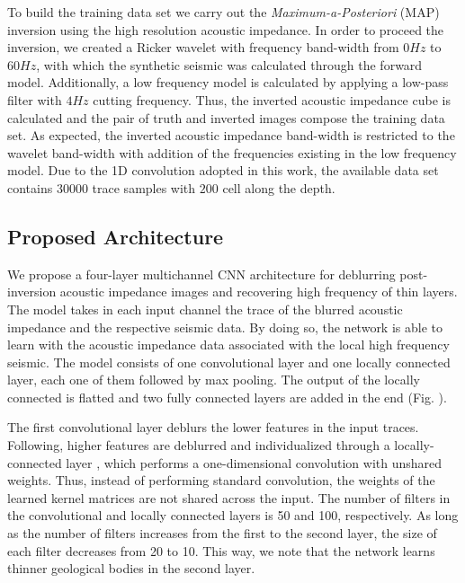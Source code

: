 \documentclass[journal]{IEEEtran}
\begin{document}
To build the training data set we carry out the \textit{Maximum-a-Posteriori} (MAP) \cite{Buland2003,Figueiredo2012} inversion using the high resolution acoustic
impedance. In order to proceed the inversion, we created a Ricker wavelet with
frequency band-width from $0Hz$ to $60Hz$, with which the synthetic seismic was
calculated through the forward model. Additionally, a low frequency
model is calculated by applying a low-pass filter with $4Hz$ cutting frequency.
Thus, the inverted acoustic impedance cube is calculated and the pair of truth
and inverted images compose the training data set. As expected, the inverted
acoustic impedance band-width is restricted to the wavelet band-width with
addition of the frequencies existing in the low frequency model. Due to the 1D
convolution adopted in this work, the available data set contains $30000$ trace
samples with $200$ cell along the depth.

\subsection{Proposed Architecture}

We propose a four-layer multichannel CNN architecture for deblurring
post-inversion acoustic impedance images and recovering high
frequency of thin layers. The model takes in each input channel the
trace of the blurred acoustic impedance and the respective seismic
data. By doing so, the network is able to learn with the acoustic
impedance data associated with the local high frequency seismic.
The model consists of one convolutional layer and one locally connected
layer, each one of them followed by max pooling. The output of the
locally connected is flatted and two fully connected layers are
added in the end (Fig. ).

The first convolutional layer deblurs the lower features in
the input traces. Following, higher features are deblurred
and individualized through a locally-connected layer \cite{},
which performs a one-dimensional convolution
with unshared weights. Thus, instead of performing standard
convolution, the weights of the learned kernel matrices are not
shared across the input. %
The number of filters in the convolutional and locally connected
layers is 50 and 100, respectively. As long as the number of
filters increases from the first to the second layer, the size
of each filter decreases from 20 to 10. This way, we note that
the network learns thinner geological bodies in the second layer.
\end{document}
